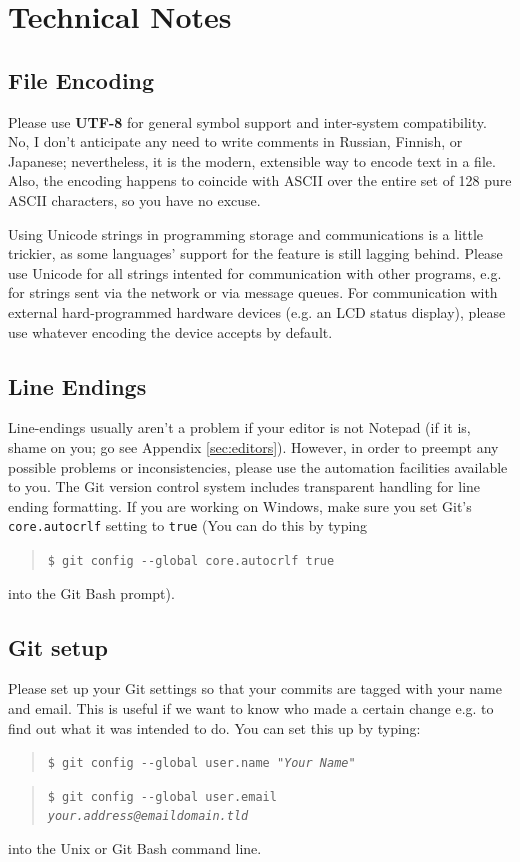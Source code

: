 \documentclass[12pt]{article}
\newcommand{\var}[1]{\texttt{#1}}
\newcommand{\commandline}[1]{\begin{quotation}\texttt{\$ #1}\end{quotation}}
\newcommand{\clloption}[1]{-{}-#1}
\newcommand{\toreplace}[1]{\emph{#1}}
\newcommand{\textdef}[1]{\textbf{#1}}
\begin{document}
\section{Technical Notes}
\subsection{File Encoding}
Please use \textdef{UTF-8} for general symbol support and inter-system compatibility. No, I don't anticipate any need to write comments in Russian, Finnish, or Japanese; nevertheless, it is the modern, extensible way to encode text in a file. Also, the encoding happens to coincide with ASCII over the entire set of 128 pure ASCII characters, so you have no excuse.

Using Unicode strings in programming storage and communications is a little trickier, as some languages' support for the feature is still lagging behind. Please use Unicode for all strings intented for communication with other programs, e.g. for strings sent via the network or via message queues. For communication with external hard-programmed hardware devices (e.g. an LCD status display), please use whatever encoding the device accepts by default.

\subsection{Line Endings} Line-endings usually aren't a problem if your editor is not Notepad (if it is, shame on you; go see Appendix \ref{sec:editors}). However, in order to preempt any possible problems or inconsistencies, please use the automation facilities available to you. The Git version control system includes transparent handling for line ending formatting. If you are working on Windows, make sure you set Git's \var{core.autocrlf} setting to \var{true} (You can do this by typing \commandline{git config \clloption{global} core.autocrlf true} into the Git Bash prompt).

\subsection{Git setup} Please set up your Git settings so that your commits are tagged with your name and email. This is useful if we want to know who made a certain change e.g. to find out what it was intended to do. You can set this up by typing:
        \commandline{git config \clloption{global} user.name "\toreplace{Your Name}"}
        \commandline{git config \clloption{global} user.email\\
        \toreplace{your.address@emaildomain.tld}}
into the Unix or Git Bash command line.
\end{document}
